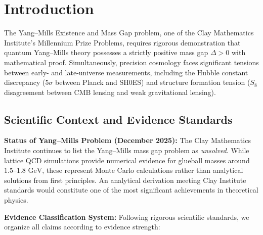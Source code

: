 \documentclass[12pt,a4paper,twoside]{article}
\theoremstyle{plain}
\theoremstyle{definition}
\theoremstyle{remark}
\newcommand{\GeV}{\,\mathrm{GeV}}
\begin{document}
\section{Introduction}
\label{sec:introduction}

The Yang--Mills Existence and Mass Gap problem, one of the Clay Mathematics 
Institute's Millennium Prize Problems, requires rigorous demonstration that 
quantum Yang--Mills theory possesses a strictly positive mass gap $\Delta > 0$ 
with mathematical proof. Simultaneously, precision cosmology faces significant 
tensions between early- and late-universe measurements, including the Hubble 
constant discrepancy ($5\sigma$ between Planck and SH0ES) and structure 
formation tension ($S_8$ disagreement between CMB lensing and weak gravitational lensing).

\subsection{Scientific Context and Evidence Standards}

\textbf{Status of Yang--Mills Problem (December 2025):} The Clay Mathematics 
Institute continues to list the Yang--Mills mass gap problem as \emph{unsolved}. 
While lattice QCD simulations provide numerical evidence for glueball masses 
around $1.5$--$1.8\,\GeV$, these represent Monte Carlo calculations rather than 
analytical solutions from first principles. An analytical derivation meeting 
Clay Institute standards would constitute one of the most significant achievements 
in theoretical physics.

\textbf{Evidence Classification System:} Following rigorous scientific standards, 
we organize all claims according to evidence strength:
\end{document}
